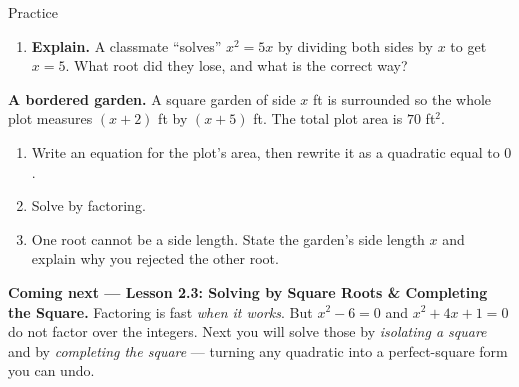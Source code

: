 \documentclass[10pt]{article}
\begin{document}
\begin{notesbox}{Practice}
\begin{enumerate}[leftmargin=1.9em, itemsep=11pt]
  \item \textbf{Explain.} A classmate ``solves'' $x^2=5x$ by dividing both sides by $x$ to get $x=5$.
        What root did they lose, and what is the correct way? 
\end{enumerate}
\end{notesbox}

\begin{extensionbox}
\textbf{A bordered garden.} A square garden of side $x$ ft is surrounded so the whole plot measures
$(x+2)$ ft by $(x+5)$ ft. The total plot area is $70$ ft$^2$.
\begin{enumerate}[label=(\alph*), leftmargin=1.8em, itemsep=5pt]
  \item Write an equation for the plot's area, then rewrite it as a quadratic equal to $0$.
  \item Solve by factoring.
  \item One root cannot be a side length. State the garden's side length $x$ and explain why you rejected
        the other root.
\end{enumerate}
\end{extensionbox}

\begin{spiralbox}
\textbf{Coming next --- Lesson 2.3: Solving by Square Roots \& Completing the Square.} Factoring is fast
\emph{when it works}. But $x^2-6=0$ and $x^2+4x+1=0$ do not factor over the integers. Next you will solve
those by \emph{isolating a square} and by \emph{completing the square} --- turning any quadratic into a
perfect-square form you can undo.
\end{spiralbox}
\end{document}
